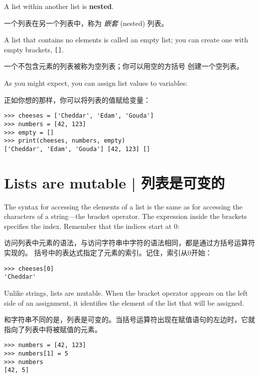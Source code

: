 %
A list within another list is {\bf nested}.

一个列表在另一个列表中，称为 {\em 嵌套} (nested) 列表。
  

A list that contains no elements is
called an empty list; you can create one with empty
brackets, \verb"[]".

一个不包含元素的列表被称为空列表；你可以用空的方括号 \li{[]} 创建一个空列表。

  

As you might expect, you can assign list values to variables:

正如你想的那样，你可以将列表的值赋给变量：

\begin{lstlisting}
>>> cheeses = ['Cheddar', 'Edam', 'Gouda']
>>> numbers = [42, 123]
>>> empty = []
>>> print(cheeses, numbers, empty)
['Cheddar', 'Edam', 'Gouda'] [42, 123] []
\end{lstlisting}

%


\section{Lists are mutable  |  列表是可变的}
\label{mutable}
  
  

The syntax for accessing the elements of a list is the same as for
accessing the characters of a string---the bracket operator.  The
expression inside the brackets specifies the index.  Remember that the
indices start at 0:

访问列表中元素的语法，与访问字符串中字符的语法相同，都是通过方括号运算符实现的。
括号中的表达式指定了元素的索引。记住，索引从0开始：

\begin{lstlisting}
>>> cheeses[0]
'Cheddar'
\end{lstlisting}

%
Unlike strings, lists are mutable.  When the bracket operator appears
on the left side of an assignment, it identifies the element of the
list that will be assigned.

和字符串不同的是，列表是可变的。当括号运算符出现在赋值语句的左边时，它就指向了列表中将被赋值的元素。


\begin{lstlisting}
>>> numbers = [42, 123]
>>> numbers[1] = 5
>>> numbers
[42, 5]
\end{lstlisting}

